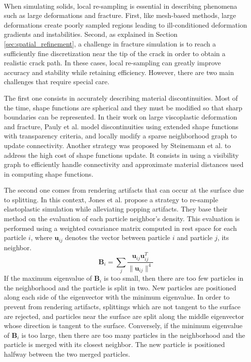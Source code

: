 \paragraph*{}
When simulating solids, local re-sampling is essential in describing phenomena such as large deformations and fracture. First, like mesh-based methods, large deformations create poorly sampled regions leading to ill-conditioned deformation gradients and instabilities. Second, as explained in Section \ref{sec:spatial_refinement}, a challenge in fracture simulation is to reach a sufficiently fine discretization near the tip of the crack in order to obtain a realistic crack path. In these cases, local re-sampling can greatly improve accuracy and stability while retaining efficiency. However, there are two main challenges that require special care.

The first one consists in accurately describing material discontinuities. Most of the time, shape functions are spherical and they must be modified so that sharp boundaries can be represented. In their work on large viscoplastic deformation and fracture, Pauly et al. \cite{Pauly2005} model discontinuities using extended shape functions with transparency criteria, and locally modify a sparse neighborhood graph to update connectivity. Another strategy was proposed by Steinemann et al. \cite{Steinemann2009} to address the high cost of shape functions update. It consists in using a visibility graph to efficiently handle connectivity and approximate material distances used in computing shape functions.

The second one comes from rendering artifacts that can occur at the surface due to splitting. In this context, Jones et al. \cite{Jones:2014:DEF} propose a strategy to re-sample elastoplastic simulation while alleviating popping artifacts. They base their method on the evaluation of each particle neighbor's density. This evaluation is performed using a weighted covariance matrix computed in rest space for each particle $i$, where $\mathbf{u}_{ij}$ denotes the vector between particle $i$ and particle $j$, its neighbor.
\begin{equation}
\label{eq:jones_re-sampling}
\mathbf{B}_{i} = \sum_{j}  \frac{\mathbf{u}_{ij}\mathbf{u}_{ij}^{T}}{\| \mathbf{u}_{ij} \|^{4}}
\end{equation}
If the maximum eigenvalue of $\mathbf{B}_{i}$ is too small, then there are too few particles in the neighborhood and the particle is split in two. New particles are positioned along each side of the eigenvector with the minimum eigenvalue. In order to prevent from rendering artifacts, splittings which are not tangent to the surface are rejected, and particles near the surface are split along the middle eigenvector whose direction is tangent to the surface. Conversely, if the minimum eigenvalue of $\mathbf{B}_{i}$ is too large, then there are too many particles in the neighborhood and the particle is merged with its closest neighbor. The new particle is positioned halfway between the two merged particles.

